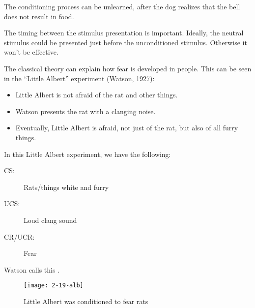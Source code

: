 \documentclass[../main/main.tex]{subfiles}
\begin{document}
\begin{remark}
  The conditioning process can be unlearned, after the dog realizes that the bell does not result in food.
\end{remark}
\begin{remark}
The timing between the stimulus presentation is important. Ideally, the neutral stimulus could be presented just before the unconditioned stimulus. Otherwise it won't be effective.
\end{remark}

The classical theory can explain how fear is developed in people. This can be seen in the ``Little Albert'' experiment (Watson, 1927):
\begin{itemize}
  \item Little Albert is not afraid of the rat and other things.
  \item Watson presents the rat with a clanging noise.
        \item Eventually, Little Albert is afraid, not just of the rat, but also of all furry things.
\end{itemize}
In this Little Albert experiment, we have the following:
\begin{description}
  \item[CS:] Rats/things white and furry
  \item[UCS:] Loud clang sound
  \item[CR/UCR:] Fear
\end{description}
\begin{remark}
Watson calls this .
\end{remark}
\begin{figure}[htpb]
  \centering
  \texttt{[image: 2-19-alb]}
  \caption{Little Albert was conditioned to fear rats}
  \label{2-19-alb}
\end{figure}

\end{document}
